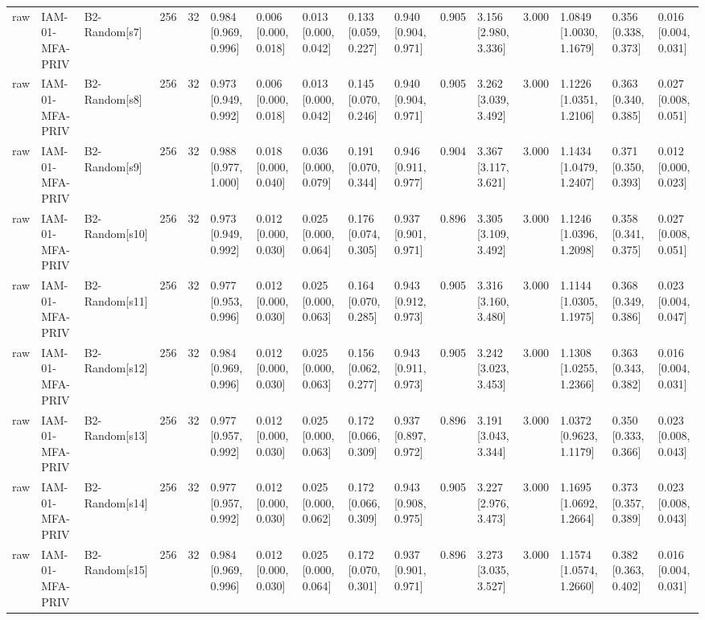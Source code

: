 \begin{table}[!ht]
{\begin{tabular}{llllllllllllllll}
raw & IAM-01-MFA-PRIV & B2-Random[s7] & 256 & 32 & 0.984 [0.969, 0.996] & 0.006 [0.000, 0.018] & 0.013 [0.000, 0.042] & 0.133 [0.059, 0.227] & 0.940 [0.904, 0.971] & 0.905 & 3.156 [2.980, 3.336] & 3.000 & 1.0849 [1.0030, 1.1679] & 0.356 [0.338, 0.373] & 0.016 [0.004, 0.031] \\
raw & IAM-01-MFA-PRIV & B2-Random[s8] & 256 & 32 & 0.973 [0.949, 0.992] & 0.006 [0.000, 0.018] & 0.013 [0.000, 0.042] & 0.145 [0.070, 0.246] & 0.940 [0.904, 0.971] & 0.905 & 3.262 [3.039, 3.492] & 3.000 & 1.1226 [1.0351, 1.2106] & 0.363 [0.340, 0.385] & 0.027 [0.008, 0.051] \\
raw & IAM-01-MFA-PRIV & B2-Random[s9] & 256 & 32 & 0.988 [0.977, 1.000] & 0.018 [0.000, 0.040] & 0.036 [0.000, 0.079] & 0.191 [0.070, 0.344] & 0.946 [0.911, 0.977] & 0.904 & 3.367 [3.117, 3.621] & 3.000 & 1.1434 [1.0479, 1.2407] & 0.371 [0.350, 0.393] & 0.012 [0.000, 0.023] \\
raw & IAM-01-MFA-PRIV & B2-Random[s10] & 256 & 32 & 0.973 [0.949, 0.992] & 0.012 [0.000, 0.030] & 0.025 [0.000, 0.064] & 0.176 [0.074, 0.305] & 0.937 [0.901, 0.971] & 0.896 & 3.305 [3.109, 3.492] & 3.000 & 1.1246 [1.0396, 1.2098] & 0.358 [0.341, 0.375] & 0.027 [0.008, 0.051] \\
raw & IAM-01-MFA-PRIV & B2-Random[s11] & 256 & 32 & 0.977 [0.953, 0.996] & 0.012 [0.000, 0.030] & 0.025 [0.000, 0.063] & 0.164 [0.070, 0.285] & 0.943 [0.912, 0.973] & 0.905 & 3.316 [3.160, 3.480] & 3.000 & 1.1144 [1.0305, 1.1975] & 0.368 [0.349, 0.386] & 0.023 [0.004, 0.047] \\
raw & IAM-01-MFA-PRIV & B2-Random[s12] & 256 & 32 & 0.984 [0.969, 0.996] & 0.012 [0.000, 0.030] & 0.025 [0.000, 0.063] & 0.156 [0.062, 0.277] & 0.943 [0.911, 0.973] & 0.905 & 3.242 [3.023, 3.453] & 3.000 & 1.1308 [1.0255, 1.2366] & 0.363 [0.343, 0.382] & 0.016 [0.004, 0.031] \\
raw & IAM-01-MFA-PRIV & B2-Random[s13] & 256 & 32 & 0.977 [0.957, 0.992] & 0.012 [0.000, 0.030] & 0.025 [0.000, 0.063] & 0.172 [0.066, 0.309] & 0.937 [0.897, 0.972] & 0.896 & 3.191 [3.043, 3.344] & 3.000 & 1.0372 [0.9623, 1.1179] & 0.350 [0.333, 0.366] & 0.023 [0.008, 0.043] \\
raw & IAM-01-MFA-PRIV & B2-Random[s14] & 256 & 32 & 0.977 [0.957, 0.992] & 0.012 [0.000, 0.030] & 0.025 [0.000, 0.062] & 0.172 [0.066, 0.309] & 0.943 [0.908, 0.975] & 0.905 & 3.227 [2.976, 3.473] & 3.000 & 1.1695 [1.0692, 1.2664] & 0.373 [0.357, 0.389] & 0.023 [0.008, 0.043] \\
raw & IAM-01-MFA-PRIV & B2-Random[s15] & 256 & 32 & 0.984 [0.969, 0.996] & 0.012 [0.000, 0.030] & 0.025 [0.000, 0.064] & 0.172 [0.070, 0.301] & 0.937 [0.901, 0.971] & 0.896 & 3.273 [3.035, 3.527] & 3.000 & 1.1574 [1.0574, 1.2660] & 0.382 [0.363, 0.402] & 0.016 [0.004, 0.031] \\

\end{tabular}}
\end{table}
